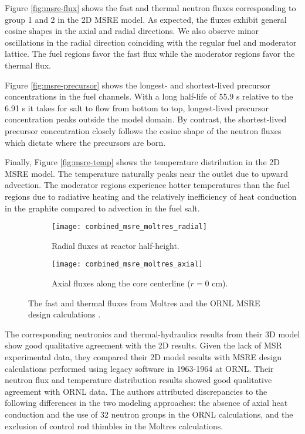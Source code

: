Figure \ref{fig:msre-flux} shows the fast and thermal neutron fluxes
corresponding to group 1 and 2 in the 2D \gls{MSRE} model. As expected, the
fluxes exhibit general cosine shapes in the axial and radial directions. We
also observe minor oscillations in the radial direction coinciding with the
regular fuel and moderator lattice. The fuel regions favor the fast flux while
the moderator regions favor the thermal flux.

Figure \ref{fig:msre-precursor}
shows the longest- and shortest-lived precursor concentrations in the fuel
channels. With a long half-life of 55.9 s relative to the 6.91 s it takes for
salt to flow from bottom to top, longest-lived precursor concentration peaks
outside the model domain. By contrast, the shortest-lived precursor
concentration closely follows the cosine shape of the neutron fluxes which
dictate where the precursors are born.

Finally, Figure \ref{fig:msre-temp}
shows the temperature distribution in the 2D \gls{MSRE} model. The temperature
naturally peaks near the outlet due to upward advection. The moderator regions
experience hotter temperatures than the fuel regions due to radiative heating
and the relatively inefficiency of heat conduction in the graphite compared to
advection in the fuel salt.

\begin{figure}[htb!]
	\centering
	\begin{subfigure}[h]{0.45\columnwidth}
	    \texttt{[image: combined\_msre\_moltres\_radial]}
	    \caption{Radial fluxes at reactor half-height.}
	    \label{fig:msre-flux-radial}
	\end{subfigure}
	\hfill
	\begin{subfigure}[h]{0.45\columnwidth}
	    \texttt{[image: combined\_msre\_moltres\_axial]}
	    \caption{Axial fluxes along the core centerline ($r=0$ cm).}
	    \label{fig:msre-flux-axial}
	\end{subfigure}
	\caption{The fast and thermal fluxes from
	Moltres \cite{lindsay_introduction_2018} and the \gls{ORNL} \gls{MSRE}
	design calculations \cite{briggs_molten-salt_1964}.}
\end{figure}

The corresponding neutronics and thermal-hydraulics results from their 3D model
show good qualitative agreement with the 2D results. Given the lack of
\gls{MSR} experimental data, they compared their 2D model results with
\gls{MSRE} design calculations performed using legacy software in 1963-1964 at
\gls{ORNL}. Their neutron flux and temperature distribution results showed good
qualitative agreement with \gls{ORNL} data. The authors attributed
discrepancies to the following differences in the two modeling approaches: the
absence of axial heat conduction and the use of 32 neutron groups in the
\gls{ORNL} calculations, and the exclusion of control rod thimbles in the
Moltres calculations.

